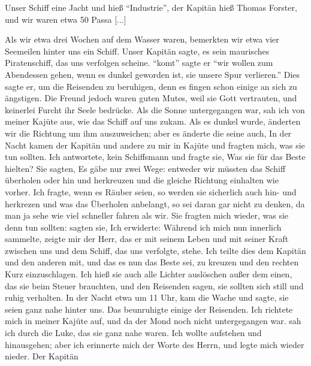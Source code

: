 Unser Schiff eine Jacht und hieß "`Industrie"', der Kapitän hieß Thomas
Forster, und wir waren etwa 50 Passa [...]

Als wir etwa drei Wochen auf dem Wasser waren, bemerkten
wir etwa vier Seemeilen hinter uns ein Schiff. Unser Kapitän
sagte, es sein maurisches Piratenschiff, das uns verfolgen
scheine. "`komt"' sagte er "`wir wollen zum Abendessen gehen,
wenn es dunkel geworden ist, sie unsere Spur verlieren."'
Dies sagte er, um die Reisenden zu beruhigen, denn es fingen
schon einige an sich zu ängstigen. Die Freund jedoch waren
guten Mutes, weil sie Gott vertrauten, und keinerlei Furcht ihr
Seele bedrücke. Als die Sonne untergegangen war, sah ich von
meiner Kajüte aus, wie das Schiff auf uns zukam. Als es
dunkel wurde, änderten wir die Richtung um ihm auszuweichen;
aber es änderte die seine auch, In der Nacht
kamen der Kapitän und andere zu mir in Kajüte und fragten
mich, was sie tun sollten. Ich antwortete,  kein Schiffsmann
und fragte sie, Was sie für das Beste hielten? Sie sagten,
Es gäbe nur zwei Wege: entweder wir müssten das Schiff überholen
oder hin und herkreuzen und die gleiche Richtung einhalten
wie vorher. Ich fragte, wenn es Räuber seien, so werden sie
sicherlich auch hin- und herkrezen und was das Überholen anbelangt,
so sei daran gar nicht zu denken, da man ja sehe wie
viel schneller fahren als wir. Sie fragten mich wieder, was
sie denn tun sollten:  sagten sie,  Ich erwiderte:  Während ich mich nun innerlich sammelte, zeigte
mir der Herr, das er mit seinem Leben und mit seiner Kraft
zwischen uns und dem Schiff, das uns verfolgte, stehe. Ich
teilte dies dem Kapitän und den anderen mit, und das es nun
das Beste sei, zu kreuzen und den rechten Kurz einzuschlagen.
Ich hieß sie auch alle Lichter auslöschen außer dem einen, das
sie beim Steuer brauchten, und den Reisenden sagen, sie sollten
sich still und ruhig verhalten. In der Nacht etwa um 11 Uhr,
kam die Wache und sagte, sie seien ganz nahe hinter uns. Das
beunruhigte einige der Reisenden. Ich richtete mich in meiner
Kajüte auf, und da der Mond noch nicht untergegangen war. sah
ich durch die Luke, das sie ganz nahe waren. Ich wollte aufstehen 
und hinausgehen; aber ich erinnerte mich der Worte des
Herrn,  und legte mich wieder nieder. Der Kapitän
